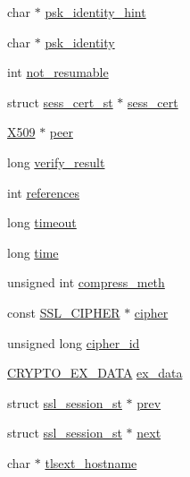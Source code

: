 \begin{DoxyCompactItemize}
\item 
char $\ast$ \hyperlink{structssl__session__st_ac93ab51ca7a64a11e87278ef4ab3fcd9}{psk\+\_\+identity\+\_\+hint}
\item 
char $\ast$ \hyperlink{structssl__session__st_a0888c0bb9a028250bd1fd8a602d22a01}{psk\+\_\+identity}
\item 
int \hyperlink{structssl__session__st_a2d8794bcc5dc992777e8ceccac831d92}{not\+\_\+resumable}
\item 
struct \hyperlink{structsess__cert__st}{sess\+\_\+cert\+\_\+st} $\ast$ \hyperlink{structssl__session__st_ae1063dff5662b52a02fedf6c0f4faf6e}{sess\+\_\+cert}
\item 
\hyperlink{crypto_2ossl__typ_8h_a4f666bde6518f95deb3050c54b408416}{X509} $\ast$ \hyperlink{structssl__session__st_a42b8ed817107b1f2f9543890d6a8cc9b}{peer}
\item 
long \hyperlink{structssl__session__st_a84b50be28bacc0340589457fc52d554a}{verify\+\_\+result}
\item 
int \hyperlink{structssl__session__st_a146fdb34d9a909e530adf8b189481195}{references}
\item 
long \hyperlink{structssl__session__st_a0eb73e1ac837828209a5b842000fa3b0}{timeout}
\item 
long \hyperlink{structssl__session__st_a8667588dec524bf854d0c16771d425a1}{time}
\item 
unsigned int \hyperlink{structssl__session__st_aa10632c44deede371e4149ce6663f832}{compress\+\_\+meth}
\item 
const \hyperlink{include_2openssl_2ssl_8h_a548d7a5d565a9e0e9bd45c49f8c95701}{S\+S\+L\+\_\+\+C\+I\+P\+H\+ER} $\ast$ \hyperlink{structssl__session__st_ae2a2e0b20a47c976a7585890b67deafe}{cipher}
\item 
unsigned long \hyperlink{structssl__session__st_a693bc4872abcf28b6ecd8d37fd64c671}{cipher\+\_\+id}
\item 
\hyperlink{crypto_2ossl__typ_8h_a7eaff1c18057495d8af18f22d1370b51}{C\+R\+Y\+P\+T\+O\+\_\+\+E\+X\+\_\+\+D\+A\+TA} \hyperlink{structssl__session__st_ac3e4fd59d6ee44a81f3a58114613c1e2}{ex\+\_\+data}
\item 
struct \hyperlink{structssl__session__st}{ssl\+\_\+session\+\_\+st} $\ast$ \hyperlink{structssl__session__st_af80db8525d9076ef19deb073228b5423}{prev}
\item 
struct \hyperlink{structssl__session__st}{ssl\+\_\+session\+\_\+st} $\ast$ \hyperlink{structssl__session__st_ac3e484e9ddf92b4774ff132baecff4d4}{next}
\item 
char $\ast$ \hyperlink{structssl__session__st_a322c71ead6960d65c1bc64bd96e1a78c}{tlsext\+\_\+hostname}

\end{DoxyCompactItemize}
